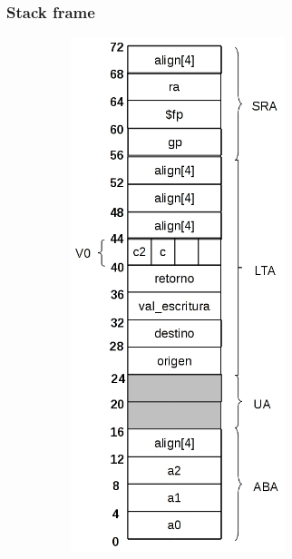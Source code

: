 \documentclass[a4paper,10pt]{article}
\begin{document}
    \subsubsection{Stack frame}
      \begin{center}
	\includegraphics[width=10cm, height=15cm]{DibujosStackFrame/stack-conversor.jpg}
      \end{center}
\end{document}
